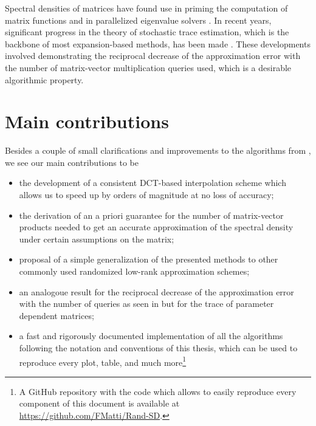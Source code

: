 Spectral densities of matrices have found use in priming the computation of matrix
functions \cite{fan2020spectrum} and in parallelized eigenvalue solvers
\cite{polizzi2009density, li2019slicing}. In recent years, significant progress
in the theory of stochastic trace estimation, which is the backbone of most
expansion-based methods, has been made \cite{meyer2021hutch, persson2022hutch}.
These developments involved demonstrating the reciprocal decrease
of the approximation error with the number of matrix-vector multiplication
queries used, which is a desirable algorithmic property.


\section{Main contributions}
\label{sec:1-introduction-contributions}

Besides a couple of small clarifications and improvements to the algorithms 
from \cite{lin2017randomized}, we see our main contributions to be

\begin{itemize}
    \item the development of a consistent \gls{DCT}-based interpolation scheme which allows us
          to speed up \cite[algorithm~5]{lin2017randomized} by orders of magnitude
          at no loss of accuracy;
    \item the derivation of an a priori guarantee for the number of matrix-vector
          products needed to get an accurate approximation of the spectral
          density under certain assumptions on the matrix;
    \item proposal of a simple generalization of the presented methods to other
          commonly used randomized low-rank approximation schemes;
    \item an analogoue result for the reciprocal decrease of the approximation
          error with the number of queries as seen in \cite[theorem~1]{meyer2021hutch}
          but for the trace of parameter dependent matrices;
    \item a fast and rigorously documented implementation of all the algorithms
          following the notation and conventions of this thesis, which can be used to
          reproduce every plot, table, and much more\footnote{A GitHub repository
          with the code which allows to easily reproduce every component of this
          document is available at \url{https://github.com/FMatti/Rand-SD}.}
\end{itemize}

